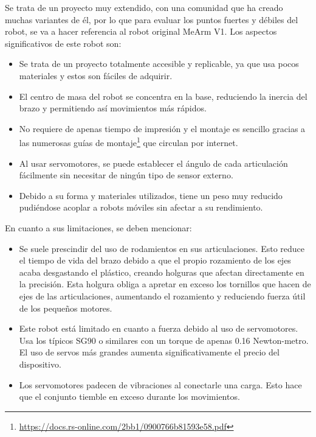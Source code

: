     Se trata de un proyecto muy extendido, con una comunidad que ha creado muchas variantes de él, por lo que para evaluar los puntos fuertes y 
    débiles del robot, se va a hacer referencia al robot original MeArm V1.
    Los aspectos significativos de este robot son:
    \begin{itemize}
        \item Se trata de un proyecto totalmente accesible y replicable, ya que usa pocos materiales y estos son fáciles de adquirir.
        \item El centro de masa del robot se concentra en la base, reduciendo la inercia del brazo y permitiendo así movimientos más rápidos.
        \item No requiere de apenas tiempo de impresión y el montaje es sencillo gracias a las numerosas guías de 
        montaje\footnote{\url{https://docs.rs-online.com/2bb1/0900766b81593e58.pdf}} que circulan por internet.
        \item Al usar servomotores, se puede establecer el ángulo de cada articulación fácilmente sin necesitar de ningún tipo de sensor externo.
        \item Debido a su forma y materiales utilizados, tiene un peso muy reducido pudiéndose acoplar a robots móviles sin afectar a 
        su rendimiento.
    \end{itemize}
    En cuanto a sus limitaciones, se deben mencionar:
    \begin{itemize}
    \item Se suele prescindir del uso de rodamientos en sus articulaciones. Esto reduce el tiempo de vida del brazo debido a que el propio rozamiento 
    de los ejes acaba desgastando el plástico, creando holguras que afectan directamente en la precisión. Esta holgura obliga a apretar en exceso los tornillos 
    que hacen de ejes de las articulaciones, aumentando el rozamiento y reduciendo fuerza útil de los pequeños motores.
    \item Este robot está limitado en cuanto a fuerza debido al uso de servomotores. Usa los típicos SG90 o similares con un torque de apenas 
    0.16 Newton-metro. El uso de servos más grandes aumenta significativamente el precio del dispositivo. 
    \item Los servomotores padecen de vibraciones al conectarle una carga. Esto hace que el conjunto tiemble en exceso durante los movimientos.
    \end{itemize}


